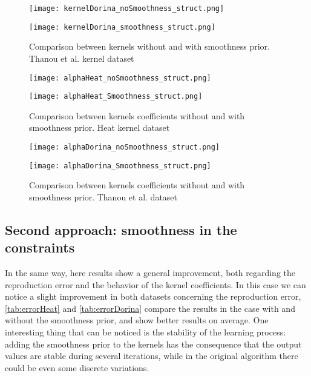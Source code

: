 \begin{figure}
  \begin{minipage}[c]{.5\textwidth}
    \centering
    \texttt{[image: kernelDorina\_noSmoothness\_struct.png]}
  \end{minipage}
  \begin{minipage}[c]{.5\textwidth}
    \centering
    \texttt{[image: kernelDorina\_smoothness\_struct.png]}
  \end{minipage}
  \caption{Comparison between kernels without and with smoothness prior. Thanou et al. kernel dataset}
  \label{fig:kernelDorina_struct}
\end{figure}

\begin{figure}[htbp]
  \centering
  \begin{minipage}[c]{.85\textwidth}
    \centering
    \texttt{[image: alphaHeat\_noSmoothness\_struct.png]}
  \end{minipage}
  \vspace{10mm}
  \begin{minipage}[c]{.85\textwidth}
    \centering
    \texttt{[image: alphaHeat\_Smoothness\_struct.png]}
  \end{minipage}
  \caption{Comparison between kernels coefficients without and with smoothness prior. Heat kernel   dataset}
  \label{fig:alphaHeat_struct}
\end{figure}

\begin{figure}[htbp]
  \centering
  \begin{minipage}[c]{.85\textwidth}
    \centering
    \texttt{[image: alphaDorina\_noSmoothness\_struct.png]}
  \end{minipage}
  \vspace{10mm}
  \begin{minipage}[c]{.85\textwidth}
    \centering
    \texttt{[image: alphaDorina\_Smoothness\_struct.png]}
  \end{minipage}
  \caption{Comparison between kernels coefficients without and with smoothness prior. Thanou et al.   dataset}
  \label{fig:alphaDorina_struct}
\end{figure}

\subsection{Second approach: smoothness in the constraints}
In the same way, here results show a general improvement, both regarding the reproduction error and the behavior of the kernel coefficients. In this case we can notice a slight improvement in both datasets concerning the reproduction error, \autoref{tab:errorHeat} and \autoref{tab:errorDorina} compare the results in the case with and without the smoothness prior, and show better results on average. One interesting thing that can be noticed is the stability of the learning process: adding the smoothness prior to the kernels has the consequence that the output values are stable during several iterations, while in the original algorithm there could be even some discrete variations.

